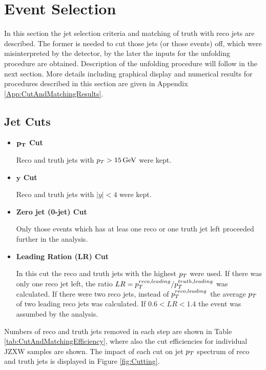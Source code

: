 \section{Event Selection}

In this section the jet selection criteria and matching of truth with reco
jets are described. The former is needed to cut those jets (or those events)
off, which were misinterpreted by the detector, by the later the inputs for the
unfolding procedure are obtained. Description of the unfolding procedure will
follow in the next section. More details including graphical display and
numerical results for procedures described in this section are given in Appendix
\ref{App:CutAndMatchingResults}.

\subsection{Jet Cuts}
\label{SubSec:JetCuts}

\begin{itemize}
  \item \textbf{$\mathbf{p_{T}}$ Cut}

    Reco and truth jets with $p_{T} > 15 \,\text{GeV}$ were kept.

  \item \textbf{$\mathbf{y}$ Cut}
    
    Reco and truth jets with $|y| < 4$ were kept.

  \item \textbf{Zero jet (0-jet) Cut}

    Only those events which has at leas one reco or one truth jet left proceeded
    further in the analysis.
    
  \item \textbf{Leading Ration (LR) Cut}

    In this cut the reco and truth jets with the highest $p_{T}$ were used. If
    there was only one reco jet left, the ratio $LR = p_{T}^{reco,leading} /
    p_{T}^{truth,leading}$ was calculated. If there were two reco jets, instead
    of $p_{T}^{reco,leading}$ the average $p_{T}$ of two leading reco jets was
    calculated. If $0.6 < LR < 1.4$ the event was assumbed by the analysis.

\end{itemize}

Numbers of reco and truth jets removed in each step are shown in Table
\ref{tab:CutAndMatchingEfficiency}, where also the cut efficiencies for individual
JZXW samples are shown. The impact of each cut on jet $p_{T}$ spectrum of reco
and truth jets is displayed in Figure \ref{fig:Cutting}. 

